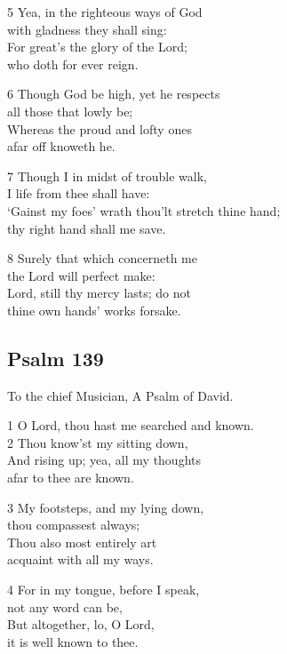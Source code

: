 5 Yea, in the righteous ways of God\\
with gladness they shall sing:\\
For great’s the glory of the Lord;\\
who doth for ever reign.

6 Though God be high, yet he respects\\
all those that lowly be;\\
Whereas the proud and lofty ones\\
afar off knoweth he.

7 Though I in midst of trouble walk,\\
I life from thee shall have:\\
‘Gainst my foes’ wrath thou’lt stretch thine hand;\\
thy right hand shall me save.

8 Surely that which concerneth me\\
the Lord will perfect make:\\
Lord, still thy mercy lasts; do not\\
thine own hands’ works forsake.

\begin{center}
\quad{}\quad{}
\end{center}

\subsection*{Psalm 139}

To the chief Musician,
A Psalm of David.

1 O Lord, thou hast me searched and known.\\
2 Thou know’st my sitting down,\\
And rising up; yea, all my thoughts\\
afar to thee are known.

3 My footsteps, and my lying down,\\
thou compassest always;\\
Thou also most entirely art\\
acquaint with all my ways.

4 For in my tongue, before I speak,\\
not any word can be,\\
But altogether, lo, O Lord,\\
it is well known to thee.


